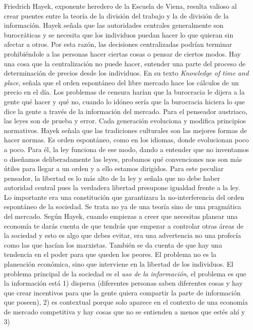 \documentclass[
]{article}
\begin{document}
Friedrich Hayek, exponente heredero de la Escuela de Viena, resulta
valioso al crear puentes entre la teoría de la división del trabajo y la
de división de la información. Hayek señala que las autoridades
centrales generalmente son burocráticas y se necesita que los individuos
puedan hacer lo que quieran sin afectar a otros. Por esta razón, las
decisiones centralizadas podrían terminar prohibiéndole a las personas
hacer ciertas cosas o pensar de ciertos modos. Hay una cosa que la
centralización no puede hacer, entender una parte del proceso de
determinación de precios desde los individuos. En su texto
\emph{Knowledge of time and place}, señala que el orden espontáneo del
libre mercado hace los cálculos de un precio en el día. Los problemas de
censura harían que la burocracia le dijera a la gente qué hacer y qué
no, cuando lo idóneo sería que la burocracia hiciera lo que dice la
gente a través de la información del mercado. Para el penseador
austriaco, las leyes son de prueba y error. Cada generación evoluciona y
modifica principios normativos. Hayek señala que las tradiciones
culturales son las mejores formas de hacer normas. Es orden espontáneo,
como en los idiomas, donde evolucionan poco a poco. Para él, la ley
funciona de ese modo, dando a entender que no inventamos o diseñamos
deliberadamente las leyes, probamos qué convenciones nos son más útiles
para llegar a un orden y a ello estamos dirigidos. Para este peculiar
pensador, la libertad es lo más alto de la ley y señala que no debe
haber autoridad central pues la verdadera libertad presupone igualdad
frente a la ley. Lo importante era una constitución que garantizara la
no-interferencia del orden espontáneo de la sociedad. Se trata no ya de
una teoría sino de una pragmática del mercado. Según Hayek, cuando
empiezas a creer que necesitas planear una economía te darás cuenta de
que tendrás que empezar a controlar otras áreas de la sociedad y esto es
algo que debes evitar, era una advertencia no una profecía como las que
hacían los marxistas. También se da cuenta de que hay una tendencia en
el poder para que queden los peores. El problema no es la planeación
económica, sino que interviene en la libertad de los individuos. El
problema principal de la sociedad es el \emph{uso de la información}, el
problema es que la información está 1) dispersa (diferentes personas
saben diferentes cosas y hay que crear incentivos para que la gente
quiera compartir la parte de información que poseen), 2) es contextual
porque solo aparece en el contexto de una economía de mercado
competitiva y hay cosas que no se entienden a menos que estés ahí y 3)
\end{document}

